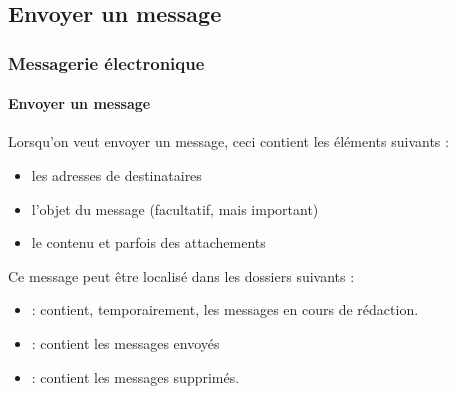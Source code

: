 \documentclass[xcolor=table]{beamer}
\begin{document}
\subsection{Envoyer un message}

\begin{frame}
\frametitle{Messagerie électronique}
\framesubtitle{Envoyer un message}

Lorsqu'on veut envoyer un message, ceci contient les éléments suivants : 
\begin{itemize}
	\item les adresses de destinataires 
	\item l'objet du message (facultatif, mais important)
	\item le contenu et parfois des attachements
\end{itemize}

Ce message peut être localisé dans les dossiers suivants :
\begin{itemize}
	\item {} : contient, temporairement, les messages en cours de rédaction.
	\item {} : contient les messages envoyés
	\item {} : contient les messages supprimés.
\end{itemize}

\end{frame}
\end{document}
